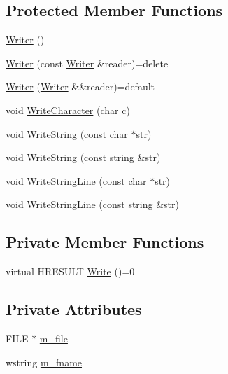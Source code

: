 \subsection*{Protected Member Functions}
\begin{DoxyCompactItemize}
\item 
\hyperlink{classmage_1_1_writer_a40b6cd3005d509e670c5a49272d9ef27}{Writer} ()
\item 
\hyperlink{classmage_1_1_writer_a0988d427f687ad5334c2ba74993e0d6e}{Writer} (const \hyperlink{classmage_1_1_writer}{Writer} \&reader)=delete
\item 
\hyperlink{classmage_1_1_writer_a241e8a12f0dba91b437de40639eda325}{Writer} (\hyperlink{classmage_1_1_writer}{Writer} \&\&reader)=default
\item 
void \hyperlink{classmage_1_1_writer_aa1ef04f5e69c44afda56704c2823316c}{Write\+Character} (char c)
\item 
void \hyperlink{classmage_1_1_writer_abffb25b71fc692db26abfa9dd147874e}{Write\+String} (const char $\ast$str)
\item 
void \hyperlink{classmage_1_1_writer_aaa0e62c04e6ff6c90fa73c64fc48635d}{Write\+String} (const string \&str)
\item 
void \hyperlink{classmage_1_1_writer_ad53f69e0f722c4d4b8b320ea39770c1a}{Write\+String\+Line} (const char $\ast$str)
\item 
void \hyperlink{classmage_1_1_writer_a542963963dc22cdecbdb3a29a3843ee9}{Write\+String\+Line} (const string \&str)
\end{DoxyCompactItemize}
\subsection*{Private Member Functions}
\begin{DoxyCompactItemize}
\item 
virtual H\+R\+E\+S\+U\+LT \hyperlink{classmage_1_1_writer_a7ef124095098e7ea8f95e3be16499be3}{Write} ()=0
\end{DoxyCompactItemize}
\subsection*{Private Attributes}
\begin{DoxyCompactItemize}
\item 
F\+I\+LE $\ast$ \hyperlink{classmage_1_1_writer_a04428b72245b50d45c62cbd23c2f039a}{m\+\_\+file}
\item 
wstring \hyperlink{classmage_1_1_writer_afa271ee47897d4961e9d62132d8faeb5}{m\+\_\+fname}
\end{DoxyCompactItemize}


